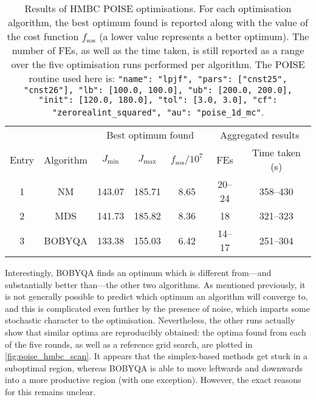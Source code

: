 \begin{table}[htb]
    \centering
    \begin{tabular}{ccccccc}
        \toprule
              &           & \multicolumn{3}{c}{Best optimum found} & \multicolumn{2}{c}{Aggregated results} \\
        \cmidrule(lr){3-5} \cmidrule(lr){6-7}
        Entry & Algorithm & $J_\text{min}$ & $J_\text{max}$ & $f_\text{sos} / 10^7$ & FEs & Time taken (\si{\s}) \\
        \midrule
        1     & NM        & 143.07 & 185.71                 & 8.65 & 20--24 & 358--430 \\
        2     & MDS       & 141.73 & 185.82                 & 8.36 & 18     & 321--323 \\
        3     & BOBYQA    & 133.38 & 155.03                 & 6.42 & 14--17 & 251--304 \\
        \bottomrule
    \end{tabular}
    \caption[POISE optimisations on HMBC]{
        Results of HMBC POISE optimisations.
        For each optimisation algorithm, the best optimum found is reported along with the value of the cost function $f_\text{sos}$ (a lower value represents a better optimum).
        The number of FEs, as well as the time taken, is still reported as a range over the five optimisation runs performed per algorithm.
        The POISE routine used here is: \texttt{{"name": "lpjf", "pars": ["cnst25", "cnst26"], "lb": [100.0, 100.0], "ub": [200.0, 200.0], "init": [120.0, 180.0], "tol": [3.0, 3.0], "cf": "zerorealint_squared", "au": "poise_1d_mc"}}.
    }
    \label{tbl:poise_hmbc}
\end{table}

Interestingly, BOBYQA finds an optimum which is different from---and substantially better than---the other two algorithms.
As mentioned previously, it is not generally possible to predict which optimum an algorithm will converge to, and this is complicated even further by the presence of noise, which imparts some stochastic character to the optimisation.
Nevertheless, the other runs actually show that similar optima are reproducibly obtained: the optima found from each of the five rounds, as well as a reference grid search, are plotted in \cref{fig:poise_hmbc_scan}.
It appears that the simplex-based methods get stuck in a suboptimal region, whereas BOBYQA is able to move leftwards and downwards into a more productive region (with one exception).
However, the exact reasons for this remains unclear.


